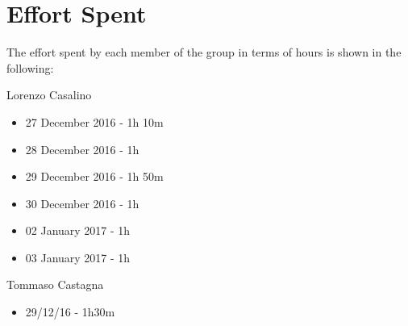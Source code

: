 \section{Effort Spent}

The effort spent by each member of the group in terms of hours is shown in the following:

Lorenzo Casalino

\begin{itemize}
	\item 27 December 2016 - 1h 10m
	\item 28 December 2016 - 1h
	\item 29 December 2016 - 1h 50m
	\item 30 December 2016 - 1h
	\item 02 January  2017 - 1h
	\item 03 January  2017 - 1h
\end{itemize}

Tommaso Castagna

\begin{itemize}
	\item 29/12/16 - 1h30m
\end{itemize}

